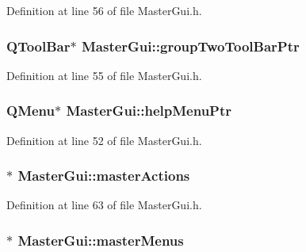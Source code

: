 Definition at line 56 of file Master\-Gui.\-h.

\hypertarget{class_master_gui_aa2c7522e568a43f38861795af343bf76}{
\subsubsection[{group\-Two\-Tool\-Bar\-Ptr}]{\setlength{\rightskip}{0pt plus 5cm}Q\-Tool\-Bar$\ast$ Master\-Gui\-::group\-Two\-Tool\-Bar\-Ptr\hspace{0.3cm}{\ttfamily [private]}}}\label{class_master_gui_aa2c7522e568a43f38861795af343bf76}


Definition at line 55 of file Master\-Gui.\-h.

\hypertarget{class_master_gui_a4125e9702c79a263642bf83f5f1e2192}{
\subsubsection[{help\-Menu\-Ptr}]{\setlength{\rightskip}{0pt plus 5cm}Q\-Menu$\ast$ Master\-Gui\-::help\-Menu\-Ptr\hspace{0.3cm}{\ttfamily [private]}}}\label{class_master_gui_a4125e9702c79a263642bf83f5f1e2192}


Definition at line 52 of file Master\-Gui.\-h.

\hypertarget{class_master_gui_a85dc72333d336db18a92207a09db4ce3}{
\subsubsection[{master\-Actions}]{$\ast$ Master\-Gui\-::master\-Actions\hspace{0.3cm}{\ttfamily [private]}}}\label{class_master_gui_a85dc72333d336db18a92207a09db4ce3}


Definition at line 63 of file Master\-Gui.\-h.

\hypertarget{class_master_gui_a27f793278e486a5bfec69ef366199e5d}{
\subsubsection[{master\-Menus}]{$\ast$ Master\-Gui\-::master\-Menus\hspace{0.3cm}{\ttfamily [private]}}}\label{class_master_gui_a27f793278e486a5bfec69ef366199e5d}


